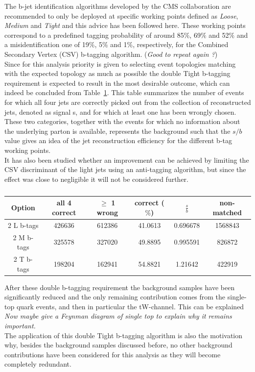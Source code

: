 The b-jet identification algorithms developed by the CMS collaboration are recommended to only be deployed at specific working points defined as \textit{Loose}, \textit{Medium} and \textit{Tight} and this advice has been followed here.
These working points correspond to a predefined tagging probability of around 85$\%$, 69$\%$ and 52$\%$ and a misidentification one of 19$\%$, 5$\%$ and 1$\%$, respectively, for the Combined Secondary Vertex (CSV) b-tagging algorithm. (\textit{Good to repeat again ?})
\\
Since for this analysis priority is given to selecting event topologies matching with the expected topology as much as possible the double Tight b-tagging requirement is expected to result in the most desirable outcome, which can indeed be concluded from Table~\ref{table::bTagResults}.
This table summarizes the number of events for which all four jets are correctly picked out from the collection of reconstructed jets, denoted as signal s, and for which at least one has been wrongly chosen. These two categories, together with the events for which no information about the underlying parton is available, represents the background such that the $s/b$ value gives an idea of the jet reconstruction efficiency for the different b-tag working points.
\\
It has also been studied whether an improvement can be achieved by limiting the CSV discriminant of the light jets using an anti-tagging algorithm, but since the effect was close to negligible it will not be considered further.
\begin{table}[h!t]
 \centering
 \caption{}\label{table::bTagResults}
 \begin{tabular}{c|c|c|c|c|c} 
  \textbf{Option} 	& all 4 correct 	& $\geq$ 1 wrong 	& correct ($\%$) 	& $\frac{s}{b}$ 	& non-matched 	\\ \hline 
  2 L b-tags		& 426636 		& 612386 		& 41.0613 		& 0.696678 		& 1568843	\\ 
  2 M b-tags 		& 325578 		& 327020 		& 49.8895 		& 0.995591 		& 826872	\\ 
  2 T b-tags 		& 198204 		& 162941 		& 54.8821 		& 1.21642 		& 422919	\\ 
 \end{tabular} 
\end{table}

After these double b-tagging requirement the background samples have been significantly reduced and the only remaining contribution comes from the single-top quark events, and then in particular the tW-channel.
This can be explained 
\\
\textit{Now maybe give a Feynman diagram of single top to explain why it remains important.}\\
The application of this double Tight b-tagging algorithm is also the motivation why, besides the background samples discussed before, no other background contributions have been considered for this analysis as they will become completely redundant.
\\


